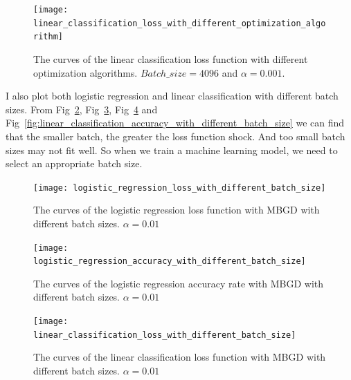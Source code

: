 \documentclass[journal, a4paper]{IEEEtran}
\begin{document}
\begin{figure}[!hbt]
    \begin{center}
    \texttt{[image: linear\_classification\_loss\_with\_different\_optimization\_algorithm]}
    \caption{The curves of the linear classification loss function with different optimization algorithms. $Batch\_size=4096$ and $\alpha=0.001$.}
    \label{fig:linear_classification_loss_with_different_optimization_algorithm}
    \end{center}
\end{figure}

I also plot both logistic regression and linear classification with different batch sizes.
From Fig~\ref{fig:logistic_regression_loss_with_different_batch_size}, Fig~\ref{fig:logistic_regression_accuracy_with_different_batch_size}, Fig~\ref{fig:linear_classification_loss_with_different_batch_size} and Fig~\ref{fig:linear_classification_accuracy_with_different_batch_size}  we can find that the smaller batch, the greater the loss function shock. And too small batch sizes may not fit well. So when we train a machine learning model, we need to select an appropriate batch size.



\begin{figure}[!hbt]
    \begin{center}
    \texttt{[image: logistic\_regression\_loss\_with\_different\_batch\_size]}
    \caption{The curves of the logistic regression loss function with MBGD with different batch sizes. $\alpha=0.01$}
    \label{fig:logistic_regression_loss_with_different_batch_size}
    \end{center}
\end{figure}

\begin{figure}[!hbt]
    \begin{center}
    \texttt{[image: logistic\_regression\_accuracy\_with\_different\_batch\_size]}
    \caption{The curves of the logistic regression accuracy rate with MBGD with different batch sizes. $\alpha=0.01$}
    \label{fig:logistic_regression_accuracy_with_different_batch_size}
    \end{center}
\end{figure}


\begin{figure}[!hbt]
    \begin{center}
    \texttt{[image: linear\_classification\_loss\_with\_different\_batch\_size]}
    \caption{The curves of the linear classification loss function with MBGD with different batch sizes. $\alpha=0.01$}
    \label{fig:linear_classification_loss_with_different_batch_size}
    \end{center}
\end{figure}
\end{document}
